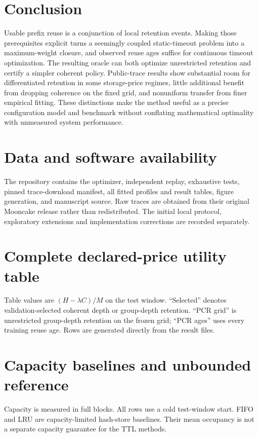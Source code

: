 \documentclass[11pt,a4paper]{article}
\begin{document}
\section{Conclusion}
Usable prefix reuse is a conjunction of local retention events. Making those
prerequisites explicit turns a seemingly coupled static-timeout problem into a
maximum-weight closure, and observed reuse ages suffice for continuous timeout
optimization. The resulting oracle can both optimize unrestricted retention and
certify a simpler coherent policy. Public-trace results show substantial room
for differentiated retention in some storage-price regimes, little additional
benefit from dropping coherence on the fixed grid, and nonuniform transfer from
finer empirical fitting. These distinctions make the method useful as a precise
configuration model and benchmark without conflating mathematical optimality
with unmeasured system performance.

\section*{Data and software availability}
The repository contains the optimizer, independent replay, exhaustive tests,
pinned trace-download manifest, all fitted profiles and result tables, figure
generation, and manuscript source. Raw traces are obtained from their original
Mooncake release rather than redistributed. The initial local protocol,
exploratory extensions and implementation corrections are recorded separately.

{\small\setlength{\bibsep}{3pt}

}

\clearpage\appendix
\section{Complete declared-price utility table}\label{app:tables}
\noindent Table values are $(H-\lambda C)/M$ on the test window. ``Selected''
denotes validation-selected coherent depth or group-depth retention. ``PCR grid''
is unrestricted group-depth retention on the frozen grid; ``PCR ages'' uses every
training reuse age. Rows are generated directly from the result files.
\begin{center}\small\setlength{\tabcolsep}{4pt}

\end{center}

\clearpage
\section{Capacity baselines and unbounded reference}\label{app:capacity}
\noindent Capacity is measured in full blocks. All rows use a cold test-window
start. FIFO and LRU are capacity-limited hash-store baselines. Their mean
occupancy is not a separate capacity guarantee for the TTL methods.
\begin{center}\small

\end{center}
\end{document}
